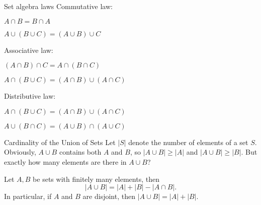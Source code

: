 





\begin{frame}{Set algebra laws}
Commutative law:

$A\cap B=B\cap A$

$A\cup (B\cup C)=(A\cup B)\cup C$

Associative law:

$(A\cap B)\cap C=A\cap (B\cap C)$

$A\cap (B\cup C)=(A\cap B)\cup (A\cap C)$

Distributive law:

$A\cap (B\cup C)=(A\cap B)\cup (A\cap C)$

$A\cup (B\cap C)=(A\cup B)\cap (A\cup C)$

\end{frame}


\begin{frame}{Cardinality of the Union of Sets}
Let $|S|$ denote the number of elements of a set $S$.  Obviously, $A\cup B$ contains both $A$ and $B$, so $|A\cup B|\geq |A|$ and $|A\cup B|\geq |B|$.  But exactly how many elements are there in $A\cup B$?

\begin{theorem} Let $A,B$ be sets with finitely many elements, then
$$|A\cup B|=|A|+|B|-|A\cap B|.$$  In particular, if $A$ and $B$ are disjoint, then $|A\cup B|=|A|+|B|$.
\end{theorem}

\end{frame}


